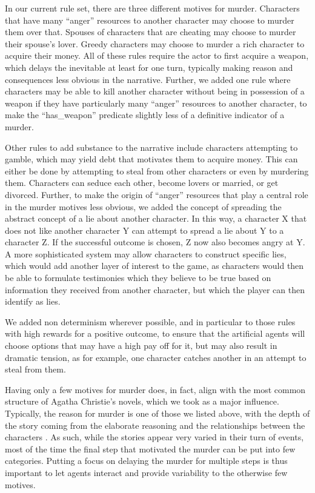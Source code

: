 In our current rule set, there are three different motives for murder.
Characters that have many \enquote{anger} resources to another character may choose to murder them over that.
Spouses of characters that are cheating may choose to murder their spouse's lover.
Greedy characters may choose to murder a rich character to acquire their money.
All of these rules require the actor to first acquire a weapon, which delays the inevitable at least for one turn, typically making reason and consequences less obvious in the narrative.
Further, we added one rule where characters may be able to kill another character without being in possession of a weapon if they have particularly many \enquote{anger} resources to another character, to make the \enquote{has\_weapon} predicate slightly less of a definitive indicator of a murder.

Other rules to add substance to the narrative include characters attempting to gamble, which may yield debt that motivates them to acquire money.
This can either be done by attempting to steal from other characters or even by murdering them.
Characters can seduce each other, become lovers or married, or get divorced.
Further, to make the origin of \enquote{anger} resources that play a central role in the murder motives less obvious, we added the concept of spreading the abstract concept of a lie about another character.
In this way, a character X that does not like another character Y can attempt to spread a lie about Y to a character Z.
If the successful outcome is chosen, Z now also becomes angry at Y.
A more sophisticated system may allow characters to construct specific lies, which would add another layer of interest to the game, as characters would then be able to formulate testimonies which they believe to be true based on information they received from another character, but which the player can then identify as lies.

We added non determinism wherever possible, and in particular to those rules with high rewards for a positive outcome, to ensure that the artificial agents will choose options that may have a high pay off for it, but may also result in dramatic tension, as for example, one character catches another in an attempt to steal from them.

Having only a few motives for murder does, in fact, align with the most common structure of Agatha Christie's novels, which we took as a major influence.
Typically, the reason for murder is one of those we listed above, with the depth of the story coming from the elaborate reasoning and the relationships between the characters \cite{verbogen_2008}.
As such, while the stories appear very varied in their turn of events, most of the time the final step that motivated the murder can be put into few categories.
Putting a focus on delaying the murder for multiple steps is thus important to let agents interact and provide variability to the otherwise few motives.

